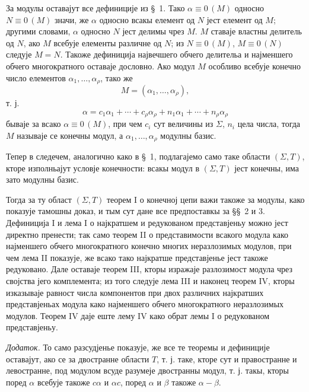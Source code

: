 ﻿\documentclass[11pt]{article}
\newcommand{\eqzero}[1]{\equiv 0\,(#1)}
\begin{document}
За модулы оставајут все дефиниције из \S~1. Тако \(\alpha\eqzero{M}\) односно \(N\eqzero{M}\) значи, же \(\alpha\) односно всакы елемент од \(N\) јест елемент од \(M\); другими словами, \(\alpha\) односно \(N\) јест делимы чрез \(M\). \(M\) ставаје властны делитель од \(N\), ако \(M\) всебује елементы различне од \(N\); из \(N\eqzero{M}\), \(M\eqzero{N}\) следује \(M=N\). Такоже дефиниција највечшего обчего делительа и најменшего обчего многократного оставаје дословно. Ако модул \(M\) особливо всебује конечно число елементов \(\alpha_1,\ldots,\alpha_\rho\), тако же
\[
 M=(\alpha_1,\ldots,\alpha_\rho),
\]
т. ј.
\[
 \alpha=c_1\alpha_1+\cdots+c_\rho\alpha_\rho
       +n_1\alpha_1+\cdots+n_\rho\alpha_\rho
\]
бываје за всако \(\alpha\eqzero{M}\), при чем \(c_i\) сут величины из \(\Sigma\), \(n_i\) цела числа, тогда \(M\) называје се конечны модул, а \(\alpha_1,\ldots,\alpha_\rho\) модулны базис.

Тепер в следечем, аналогично како в \S~1, подлагајемо само таке области \((\Sigma,T)\), кторе изполньајут условје конечности: всакы модул в \((\Sigma,T)\) јест конечны, има зато модулны базис.

Тогда за ту област \((\Sigma,T)\) теорем I о конечној цепи важи такоже за модулы, како показује тамошны доказ, и тым сут дане все предпоставкы за \S\S~2 и 3. Дефиниција I и лема I о најкратшем и редукованом представјеньу можно јест директно пренести; так само теорем II о представимости всакого модула како најменшего обчего многократного конечно многих неразлозимых модулов, при чем лема II показује, же всако тако најкратше представјенье јест такоже редуковано. Дале оставаје теорем III, кторы изражаје разлозимост модула чрез својства јего комплемента; из того следује лема III и наконец теорем IV, кторы изказываје равност числа компонентов при двох различних најкратших представјеньах модула како најменшего обчего многократного неразлозимых модулов. Теорем IV даје еште лему IV како обрат лемы I о редукованом представјеньу.

\emph{Додаток.} То само разсудјенье показује, же все те теоремы и дефиниције оставајут, ако се за двостранне области \(T\), т. ј. таке, кторе сут и правостранне и левостранне, под модулом всуде разумеје двостранны модул, т. ј. такы, кторы поред \(\alpha\) всебује такоже \(c\alpha\) и \(\alpha c\), поред \(\alpha\) и \(\beta\) такоже \(\alpha-\beta\).
\end{document}
